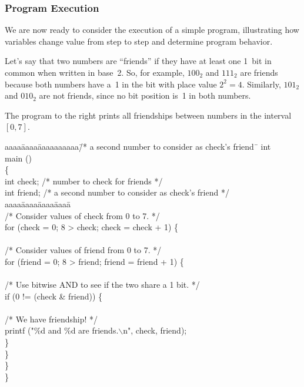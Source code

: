 \subsubsection{Program Execution}

\begin{minipage}{1.75in}
We are now ready to consider the execution of a simple program,
illustrating how variables change value from step to step and
determine program behavior.\mpline

Let's say that two numbers are ``friends'' if they have at least one
1~bit in common when written in base~2.  So, for example, $100_2$ and 
$111_2$ are friends because both numbers have a~1 in the bit with 
place value $2^2=4$.  Similarly, $101_2$ and $010_2$ are not friends,
since no bit position is~1 in both numbers.\mpline

The program to the right prints all friendships between numbers
in the interval~$[0,7]$.\linebreak
\end{minipage}\hspace{0.24in}%
\begin{minipage}{4.51in}
{\fix
\begin{tabbing}
aaaa\=aaaa\=aaaaaaaaaa\=/* a second number to consider as check's friend~\=\kill
int\\
main ()\\
\{\\
\>  int \> check;  \> /* number to check for friends \> */\\
\>  int \> friend; \> /* a second number to consider as check's friend \> */\\
aaaa\=aaaa\=aaaa\=aaaa\=\kill
\>  \\
\>  /* Consider values of check from 0 to 7. */\\
\>  for (check = 0; 8 > check; check = check + 1) \{\\
\\
\>  \>  /* Consider values of friend from 0 to 7. */\\
\>  \>  for (friend = 0; 8 > friend; friend = friend + 1) \{\\
\\
\>  \>  \>  /* Use bitwise AND to see if the two share a 1 bit. */\\
\>  \>  \>  if (0 != (check \& friend)) \{\\
\\
\>  \>  \>  \>  /* We have friendship! */\\
\>  \>  \>  \>  printf ("\%d and \%d are friends.$\backslash$n", check, friend);\\
\>  \>  \>  \}\\
\>  \>  \}\\
\>  \}\\
\}
\end{tabbing}
}
\end{minipage}

